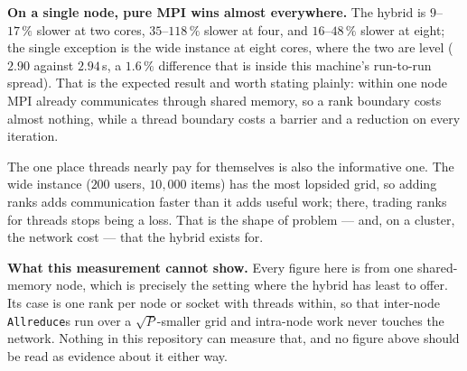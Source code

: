 \documentclass[twocolumn]{article}
\begin{document}
    \begin{table}[!h]
        \caption{\label{tab:hybrid-vs-pure}Hybrid ($2$ threads/rank) vs.\ pure MPI at
        equal core count (time, s). Both measured on this laptop in one run.}
        \centering
    \end{table}

    \textbf{On a single node, pure MPI wins almost everywhere.} The hybrid is $9$--$17\,\%$
    slower at two cores, $35$--$118\,\%$ slower at four, and $16$--$48\,\%$ slower at
    eight; the single exception is the wide instance at eight cores, where the two are
    level ($2.90$ against $2.94$\,s, a $1.6\,\%$ difference that is inside this machine's
    run-to-run spread). That is the expected result and worth stating plainly: within one
    node MPI already communicates through shared memory, so a rank boundary costs almost
    nothing, while a thread boundary costs a barrier and a reduction on every iteration.

    The one place threads nearly pay for themselves is also the informative one. The wide
    instance ($200$ users, $10{,}000$ items) has the most lopsided grid, so adding ranks
    adds communication faster than it adds useful work; there, trading ranks for threads
    stops being a loss. That is the shape of problem --- and, on a cluster, the network
    cost --- that the hybrid exists for.

    \textbf{What this measurement cannot show.} Every figure here is from one shared-memory
    node, which is precisely the setting where the hybrid has least to offer. Its case is
    one rank per node or socket with threads within, so that inter-node
    \texttt{Allreduce}s run over a $\sqrt{P}$-smaller grid and intra-node work never
    touches the network. Nothing in this repository can measure that, and no figure above
    should be read as evidence about it either way.
\end{document}

